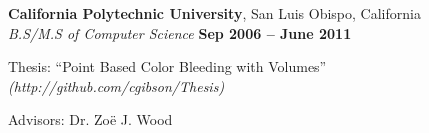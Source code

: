 \documentclass[margin,line]{resume}
\begin{document}
\begin{resume}
    \textbf{\listing California Polytechnic University}, San Luis Obispo, California \vspace{2mm}\\\vspace{1mm}%
    \textsl{B.S/M.S of Computer Science} \hfill \textbf{ Sep 2006 -- June 2011}\vspace{-3mm}\\\vspace{-1mm}%
    \begin{list2}
        \item Thesis: ``Point Based Color Bleeding with Volumes'' \textsl{(http://github.com/cgibson/Thesis)}
        \item Advisors:  Dr. Zo\"{e} J. Wood
    \end{list2}\vspace{-1.5mm}


\end{resume}
\end{document}

